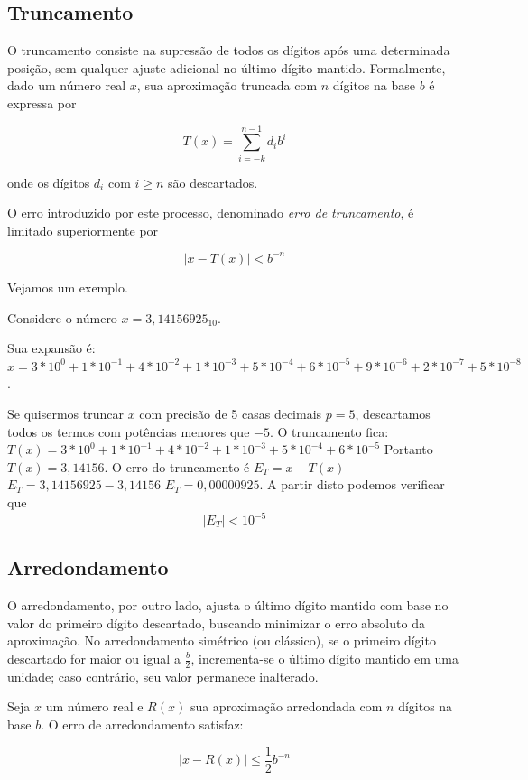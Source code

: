 \subsection*{Truncamento}

O truncamento consiste na supressão de todos os dígitos após uma determinada posição, sem qualquer ajuste adicional no último dígito mantido. Formalmente, dado um número real \( x \), sua aproximação truncada com \( n \) dígitos na base \( b \) é expressa por

\[
T(x) = \sum_{i = -k}^{n-1} d_i b^i
\]

onde os dígitos \( d_i \) com \( i \geq n \) são descartados.

O erro introduzido por este processo, denominado \textit{erro de truncamento}, é limitado superiormente por

\[
|x - T(x)| < b^{-n}
\]

Vejamos um exemplo.

Considere o número \(x = 3,14156925_{10}\).

Sua expansão é:
 \(x = 3*10^0 + 1*10^{-1} + 4*10^{-2} + 1*10^{-3} + 5*10^{-4} + 6*10^{-5} + 9*10^{-6} + 2*10^{-7} + 5*10^{-8}\).

Se quisermos truncar \(x\)  com precisão de 5 casas decimais \(p=5\), descartamos todos os termos com potências menores que \(-5\). O truncamento fica:
\(T(x) = 3*10^0 + 1*10^{-1} + 4*10^{-2} + 1*10^{-3} + 5*10^{-4} + 6*10^{-5}\)
Portanto \(T(x) = 3,14156\).
O erro do truncamento é \(E_T = x - T(x)  \) \implies \(E_T = 3,14156925 - 3,14156  \) \implies \(E_T = 0,00000925  \). A partir disto podemos verificar que 
\[
|E_T| < 10^{-5}
\]


\subsection*{Arredondamento}

O arredondamento, por outro lado, ajusta o último dígito mantido com base no valor do primeiro dígito descartado, buscando minimizar o erro absoluto da aproximação. No arredondamento simétrico (ou clássico), se o primeiro dígito descartado for maior ou igual a \( \frac{b}{2} \), incrementa-se o último dígito mantido em uma unidade; caso contrário, seu valor permanece inalterado.

Seja \( x \) um número real e \( R(x) \) sua aproximação arredondada com \( n \) dígitos na base \( b \). O erro de arredondamento satisfaz:

\[
|x - R(x)| \leq \frac{1}{2} b^{-n}
\]

